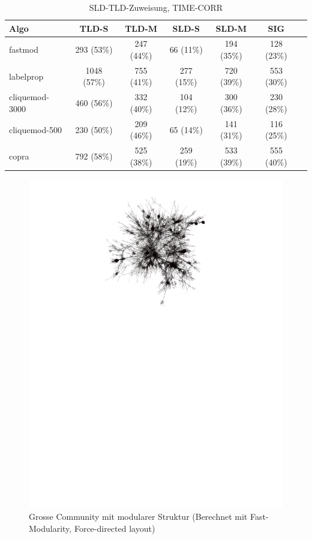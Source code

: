 {\footnotesize
\begin{table}[h]
  \centering
  \begin{tabular}{l|c|c|c|c|c|c}
    Algo & TLD-S & TLD-M & SLD-S & SLD-M & SIG \\
    \hline
    fastmod & 293 (53\%) & 247 (44\%) & 66 (11\%) & 194 (35\%) & 128
    (23\%) \\
    \hline
    labelprop & 1048 (57\%) & 755 (41\%) & 277 (15\%) & 720 (39\%) &
    553 (30\%) \\
    \hline
    cliquemod-3000 & 460 (56\%) & 332 (40\%) & 104 (12\%) & 300 (36\%)
    & 230 (28\%) \\
    \hline
    cliquemod-500 & 230 (50\%) & 209 (46\%) & 65 (14\%) & 141 (31\%) &
    116 (25\%) \\
    \hline
    copra & 792 (58\%) & 525 (38\%) & 259 (19\%) & 533 (39\%) & 555 (40\%)

  \end{tabular}
  \caption{SLD-TLD-Zuweisung, TIME-CORR}
  \label{tab:assign}
\end{table}
}

\begin{figure}[t]
  \centering
  \includegraphics[scale=1.7]{images/fastmod-subgraph-large-modular-6525064ccab580a0b304a3620b197d7a.pdf}
  \caption{Grosse Community mit modularer Struktur (Berechnet mit
    Fast-Modularity, Force-directed layout)}
  \label{fig:large-community-modular}
\end{figure}

